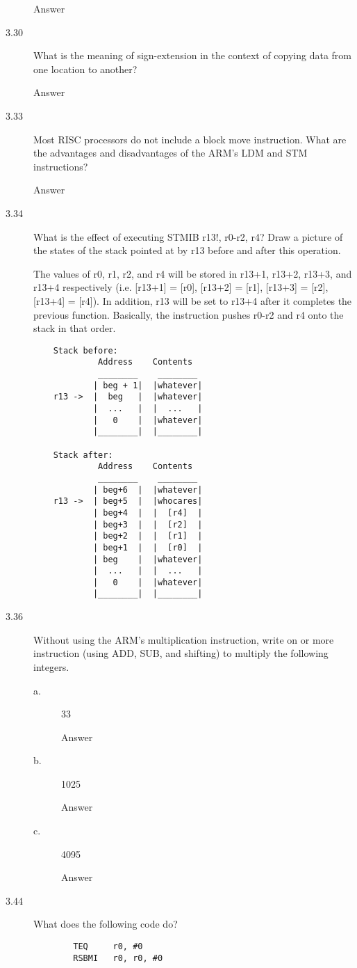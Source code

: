 \documentclass[letterpaper,10pt,titlepage]{article}
\begin{document}
\begin{description}
    Answer
    \item[3.30] What is the meaning of sign-extension in the context of copying data from one location to another?
    
    Answer
    \item[3.33] Most RISC processors do not include a block move instruction. What are the advantages and disadvantages of the ARM's LDM and STM instructions?
    
    Answer
    \item[3.34] What is the effect of executing STMIB r13!, {r0-r2, r4}? Draw a picture of the states of the stack pointed at by r13 before and after this operation.
    
    The values of r0, r1, r2, and r4 will be stored in r13+1, r13+2, r13+3, and r13+4 respectively (i.e. [r13+1] = [r0], [r13+2] = [r1], [r13+3] = [r2], [r13+4] = [r4]). In addition, r13 will be set to r13+4 after it completes the previous function. Basically, the instruction pushes r0-r2 and r4 onto the stack in that order. 
    
    \begin{lstlisting}
    Stack before:
             Address    Contents
             ________    ________
            | beg + 1|  |whatever|
    r13 ->  |  beg   |  |whatever|
            |  ...   |  |  ...   |
            |   0    |  |whatever|
            |________|  |________|
    
    Stack after:
             Address    Contents
             ________    ________
            | beg+6  |  |whatever|
    r13 ->  | beg+5  |  |whocares|
            | beg+4  |  |  [r4]  |
            | beg+3  |  |  [r2]  |
            | beg+2  |  |  [r1]  |
            | beg+1  |  |  [r0]  |
            | beg    |  |whatever|
            |  ...   |  |  ...   |
            |   0    |  |whatever|
            |________|  |________|
    \end{lstlisting}
    \item[3.36] Without using the ARM's multiplication instruction, write on or more instruction (using ADD, SUB, and shifting) to multiply the following integers.
    \begin{description}
        \item[a.] 33
        
        Answer
        \item[b.] 1025
        
        Answer
        \item[c.] 4095
        
        Answer
    \end{description}
    \item[3.44] What does the following code do?
    \begin{lstlisting}
        TEQ     r0, #0
        RSBMI   r0, r0, #0
    \end{lstlisting}
    

\end{description}
\end{document}
